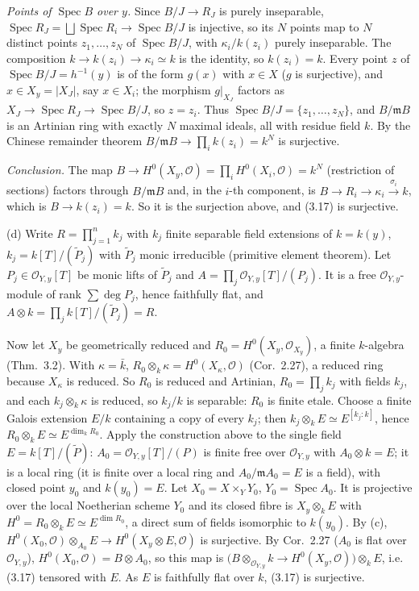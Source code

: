 \documentclass[11pt]{article}
\begin{document}
\emph{Points of $\operatorname{Spec}B$ over $y$.} Since $B/J\to R_J$ is purely inseparable, $\operatorname{Spec}R_J=\bigsqcup\operatorname{Spec}R_i\to\operatorname{Spec}B/J$ is injective, so its $N$ points map to $N$ distinct points $z_1,\dots,z_N$ of $\operatorname{Spec}B/J$, with $\kappa_i/k(z_i)$ purely inseparable. The composition $k\to k(z_i)\to\kappa_i\simeq k$ is the identity, so $k(z_i)=k$. Every point $z$ of $\operatorname{Spec}B/J=h^{-1}(y)$ is of the form $g(x)$ with $x\in X$ ($g$ is surjective), and $x\in X_y=|X_J|$, say $x\in X_i$; the morphism $g|_{X_J}$ factors as $X_J\to\operatorname{Spec}R_J\to\operatorname{Spec}B/J$, so $z=z_i$. Thus $\operatorname{Spec}B/J=\{z_1,\dots,z_N\}$, and $B/\mathfrak mB$ is an Artinian ring with exactly $N$ maximal ideals, all with residue field $k$. By the Chinese remainder theorem $B/\mathfrak mB\to\prod_ik(z_i)=k^N$ is surjective.

\emph{Conclusion.} The map $B\to H^0(X_y,\mathcal O)=\prod_iH^0(X_i,\mathcal O)=k^N$ (restriction of sections) factors through $B/\mathfrak mB$ and, in the $i$-th component, is $B\to R_i\to\kappa_i\xrightarrow{\sigma_i}k$, which is $B\to k(z_i)=k$. So it is the surjection above, and (3.17) is surjective.

(d) Write $R=\prod_{j=1}^nk_j$ with $k_j$ finite separable field extensions of $k=k(y)$, $k_j=k[T]/(\tilde P_j)$ with $\tilde P_j$ monic irreducible (primitive element theorem). Let $P_j\in\mathcal O_{Y,y}[T]$ be monic lifts of $\tilde P_j$ and $A=\prod_j\mathcal O_{Y,y}[T]/(P_j)$. It is a free $\mathcal O_{Y,y}$-module of rank $\sum\deg P_j$, hence faithfully flat, and $A\otimes k=\prod_jk[T]/(\tilde P_j)=R$.

Now let $X_y$ be geometrically reduced and $R_0=H^0(X_y,\mathcal O_{X_y})$, a finite $k$-algebra (Thm.~3.2). With $\kappa=\bar k$, $R_0\otimes_k\kappa=H^0(X_\kappa,\mathcal O)$ (Cor.~2.27), a reduced ring because $X_\kappa$ is reduced. So $R_0$ is reduced and Artinian, $R_0=\prod_jk_j$ with fields $k_j$, and each $k_j\otimes_k\kappa$ is reduced, so $k_j/k$ is separable: $R_0$ is finite etale. Choose a finite Galois extension $E/k$ containing a copy of every $k_j$; then $k_j\otimes_kE\simeq E^{[k_j:k]}$, hence $R_0\otimes_kE\simeq E^{\dim_kR_0}$. Apply the construction above to the single field $E=k[T]/(\tilde P)$: $A_0=\mathcal O_{Y,y}[T]/(P)$ is finite free over $\mathcal O_{Y,y}$ with $A_0\otimes k=E$; it is a local ring (it is finite over a local ring and $A_0/\mathfrak mA_0=E$ is a field), with closed point $y_0$ and $k(y_0)=E$. Let $X_0=X\times_YY_0$, $Y_0=\operatorname{Spec}A_0$. It is projective over the local Noetherian scheme $Y_0$ and its closed fibre is $X_y\otimes_kE$ with $H^0=R_0\otimes_kE\simeq E^{\dim R_0}$, a direct sum of fields isomorphic to $k(y_0)$. By (c), $H^0(X_0,\mathcal O)\otimes_{A_0}E\to H^0(X_y\otimes E,\mathcal O)$ is surjective. By Cor.~2.27 ($A_0$ is flat over $\mathcal O_{Y,y}$), $H^0(X_0,\mathcal O)=B\otimes A_0$, so this map is $\bigl(B\otimes_{\mathcal O_{Y,y}}k\to H^0(X_y,\mathcal O)\bigr)\otimes_kE$, i.e. (3.17) tensored with $E$. As $E$ is faithfully flat over $k$, (3.17) is surjective.
\end{document}
